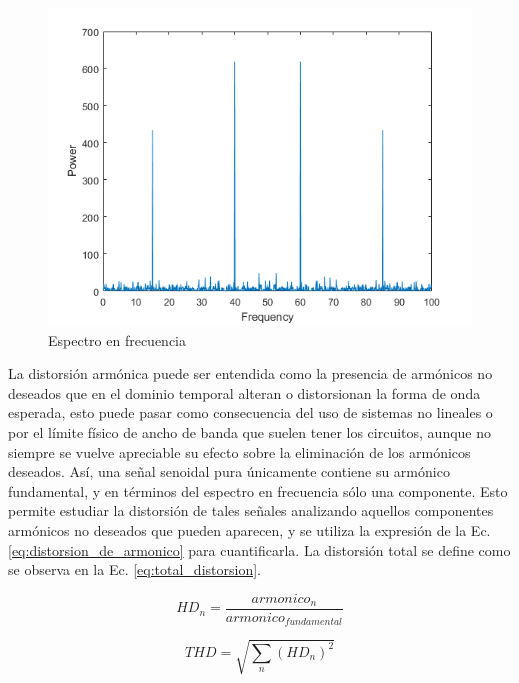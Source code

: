 \begin{figure}[H]
    \centering
    \includegraphics[scale=0.4]{../EJ3/Recursos/BasicSpectralAnalysisExample_01.png} 
    \caption{Espectro en frecuencia}
\end{figure}

La distorsi\'on arm\'onica puede ser entendida como la presencia de arm\'onicos no deseados que en el dominio temporal alteran o distorsionan la forma
de onda esperada, esto puede pasar como consecuencia del uso de sistemas no lineales o por el l\'imite f\'isico de ancho de banda que suelen tener
los circuitos, aunque no siempre se vuelve apreciable su efecto sobre la eliminaci\'on de los arm\'onicos deseados.
As\'i, una se\~nal senoidal pura \'unicamente contiene su arm\'onico fundamental, y en t\'erminos del espectro en frecuencia s\'olo una componente. Esto permite
estudiar la distorsi\'on de tales se\~nales analizando aquellos componentes arm\'onicos no deseados que pueden aparecen, y se utiliza la expresi\'on de la Ec. \ref{eq:distorsion_de_armonico}
para cuantificarla. La distorsi\'on total se define como se observa en la Ec. \ref{eq:total_distorsion}.

\begin{equation}
    HD_n = \frac{armonico_n}{armonico_{fundamental}}
    \label{eq:distorsion_de_armonico}
\end{equation}

\begin{equation}
    THD = \sqrt{\sum_{n} (HD_n)^{2}}
    \label{eq:total_distorsion}
\end{equation}

